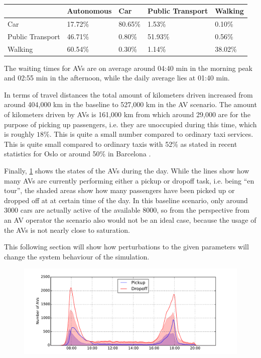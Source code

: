 \begin{table}[]
\centering
\caption{}
\label{tab:basemodeshares}
\begin{tabular}{@{}lllll@{}}
\toprule
                 & Autonomous & Car     & Public Transport & Walking \\ \midrule
Car              & 17.72\%    & 80.65\% & 1.53\%           & 0.10\%  \\
Public Transport & 46.71\%    & 0.80\%  & 51.93\%          & 0.56\%  \\
Walking          & 60.54\%    & 0.30\%  & 1.14\%           & 38.02\% \\ \bottomrule
\end{tabular}
\end{table}

The waiting times for AVs are on average around 04:40 min in the morning peak
and 02:55 min in the afternoon, while the daily average lies at 01:40 min.

In terms of travel distances the total amount of kilometers driven increased from around 404,000 km in
the baseline to 527,000 km in the AV scenario. The amount of kilometers driven by AVs
is 161,000 km from which around 29,000 are for the purpose of picking up passengers, i.e.
they are unoccupied during this time, which is roughly $18\%$. This is quite a small number
compared to ordinary taxi services. This is quite small compared to ordinary taxis with
52\% as stated in recent statistics for Oslo \citep{Norway2015} or around 50\% in Barcelona
\citep{Amat2014}.

Finally, \cref{fig:avwork} shows the states of the AVs during the day. While the
lines show how many AVs are currently performing either a pickup or dropoff task,
i.e. being ``en tour'', the shaded areas show how many passengers have been picked
up or dropped off at at certain time of the day. In this baseline scenario, only
around 3000 cars are actually active of the available 8000, so from the perspective
from an AV operator the scenario also would not be an ideal case, because the
usage of the AVs is not nearly close to saturation.

This following section will show how perturbations to the given parameters will
change the system behaviour of the simulation.

\begin{figure}
    \centering
    \includegraphics[width=1.0\textwidth]{figures/avwork.pdf}
    \caption{}
    \label{fig:avwork}
\end{figure}

